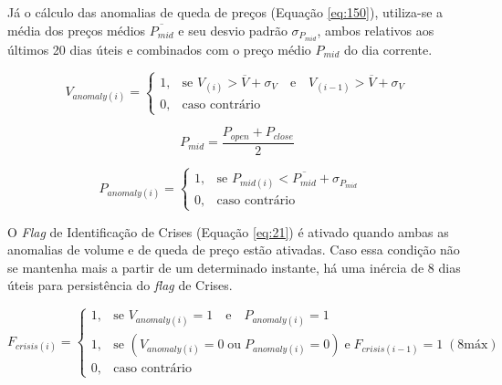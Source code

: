 \begin{itemize}
        Já o cálculo das anomalias de queda de preços (Equação \ref{eq:150}), utiliza-se a média dos preços médios \begin{math} \overline{P_{mid}} \end{math} e seu desvio padrão \begin{math} \sigma_{P_{mid}} \end{math}, ambos relativos aos últimos 20 dias úteis e combinados com o preço médio \begin{math} P_{mid} \end{math} do dia corrente.

        \begin{equation} \label{eq:20}
            V_{anomaly(i)} = \begin{cases} 1, & \mbox{se } V_{(i)} > \overline{V} + \sigma_V \quad \textrm{e} \quad V_{(i-1)} > \overline{V} + \sigma_V \\
                0, & \mbox{caso contr\'ario} \end{cases}
        \end{equation}

        \begin{equation} \label{eq:22}
            P_{mid} = \dfrac{P_{open} + P_{close}}{2}
        \end{equation}

        \begin{equation} \label{eq:150}
            P_{anomaly(i)} = \begin{cases} 1, & \mbox{se } P_{mid(i)} < \overline{P_{mid}} + \sigma_{P_{mid}} \quad \\
                0, & \mbox{caso contr\'ario} \end{cases}
        \end{equation}

        O \textit{Flag} de Identificação de Crises (Equação \ref{eq:21}) é ativado quando ambas as anomalias de volume e de queda de preço estão ativadas. Caso essa condição não se mantenha mais a partir de um determinado instante, há uma inércia de 8 dias úteis para persistência do \textit{flag} de Crises.

        \begin{equation} \label{eq:21}
            F_{crisis(i)} = \begin{cases} 1, & \mbox{se } V_{anomaly(i)} = 1 \quad \textrm{e} \quad P_{anomaly(i)} = 1 \\
                1, & \mbox{se } (V_{anomaly(i)} = 0 \; \textrm{ou} \; P_{anomaly(i)} = 0) \; \textrm{e} \; F_{crisis(i-1)} = 1 \; (8 \textrm{m\'ax}) \\
                0, & \mbox{caso contr\'ario} \end{cases}
        \end{equation}


\end{itemize}
